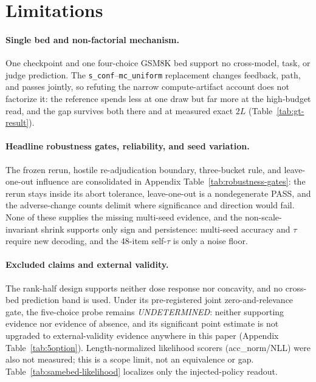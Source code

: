 \documentclass{article}
\newcommand{\sconf}{\texttt{s\_conf}}
\newcommand{\mcu}{\texttt{mc\_uniform}}
\begin{document}
\section{Limitations}
\label{sec:limitations}

\paragraph{Single bed and non-factorial mechanism.}
One checkpoint and one four-choice GSM8K bed support no cross-model, task, or
judge prediction.  The \sconf{}--\mcu{} replacement changes feedback, path,
and passes jointly, so refuting the narrow compute-artifact account does not
factorize it: the reference spends less at one draw but far more at the
high-budget read, and the gap survives both there and at measured exact $2L$
(Table~\ref{tab:gt-result}).

\paragraph{Headline robustness gates, reliability, and seed variation.}
The frozen rerun, hostile re-adjudication boundary, three-bucket rule, and
leave-one-out influence are consolidated in Appendix
Table~\ref{tab:robustness-gates}: the rerun stays inside its abort tolerance,
leave-one-out is a nondegenerate PASS, and the adverse-change counts delimit
where significance and direction would fail.  None of these supplies the
missing multi-seed evidence, and the non-scale-invariant shrink supports only
sign and persistence: multi-seed accuracy and $\tau$ require new decoding, and
the 48-item self-$\tau$ is only a noise floor.

\paragraph{Excluded claims and external validity.}
The rank-half design supports neither dose response nor concavity, and no
cross-bed prediction band is used.  Under its pre-registered joint
zero-and-relevance gate, the five-choice probe remains \emph{UNDETERMINED}:
neither supporting evidence nor evidence of absence, and its significant point
estimate is not upgraded to external-validity evidence anywhere in this paper
(Appendix Table~\ref{tab:5option}).  Length-normalized likelihood scorers
(acc\_norm/NLL) were also not measured; this is a scope limit, not an
equivalence or gap.  Table~\ref{tab:samebed-likelihood} localizes only the
injected-policy readout.
\end{document}
